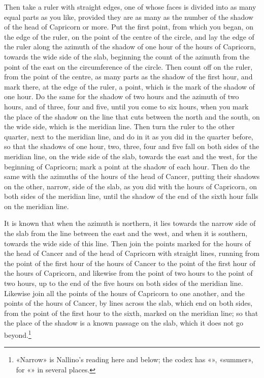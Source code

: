 \documentclass[11pt]{article}
\newcommand{\ArPage}[1]{\marginpar{\footnotesize\color{gray}Ar.\,p.\,#1}}
\begin{document}
\par \ArPage{204}Then take a ruler with straight edges, one of whose faces is divided into as many equal parts as you like, provided they are as many as the number of the shadow of the head of Capricorn or more. Put the first point, from which you began, on the edge of the ruler, on the point of the centre of the circle, and lay the edge of the ruler along the azimuth of the shadow of one hour of the hours of Capricorn, towards the wide side of the slab, beginning the count of the azimuth from the point of the east on the circumference of the circle. Then count off on the ruler, from the point of the centre, as many parts as the shadow of the first hour, and mark there, at the edge of the ruler, a point, which is the mark of the shadow of one hour. Do the same for the shadow of two hours and the azimuth of two hours, and of three, four and five, until you come to six hours, when you mark the place of the shadow on the line that cuts between the north and the south, on the wide side, which is the meridian line. Then turn the ruler to the other quarter, next to the meridian line, and do in it as you did in the quarter before, so that the shadows of one hour, two, three, four and five fall on both sides of the meridian line, on the wide side of the slab, towards the east and the west, for the beginning of Capricorn; mark a point at the shadow of each hour. Then do the same with the azimuths of the hours of the head of Cancer, putting their shadows on the other, narrow, side of the slab, as you did with the hours of Capricorn, on both sides of the meridian line, until the shadow of the end of the sixth hour falls on the meridian line.\par
\par It is known that when the azimuth is northern, it lies towards the narrow side of the slab from the line between the east and the west, and when it is southern, towards the wide side of this line. Then join the points marked for the hours of the head of Cancer and of the head of Capricorn with straight lines, running from the point of the first hour of the hours of Cancer to the point of the first hour of the hours of Capricorn, and likewise from the point of two hours to the point of two hours, up to the end of the five hours on both sides of the meridian line. Likewise join all the points of the hours of Capricorn to one another, and the points of the hours of Cancer, by lines across the slab, which end on both sides, from the point of the first hour to the sixth, marked on the meridian line; so that the place of the shadow is a known passage on the slab, which it does not go beyond.\footnote{«Narrow» is Nallino's reading here and below; the codex has «», «summer», for «» in several places.}\par
\end{document}
